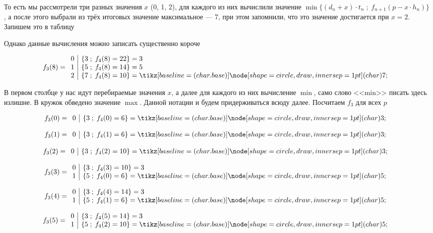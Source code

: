 \begin{enumerate}
	То есть мы рассмотрели три разных значения $x$ (0, 1, 2), для каждого из них вычислили значение $\min\Big\{(d_n + x) \cdot t_n \; ; \; f_{n+1}(p - x \cdot h_n)\Big\}$, а после этого выбрали из трёх итоговых значение максимальное --- 7, при этом запомнили, что это значение достигается при $x = 2$. Запишем это в таблицу
	
	
	
	Однако данные вычисления можно записать существенно короче
	
	\[
	f_3(8) = \begin{array}{c|l}
		0 & \{3 \; ; \; f_4(8) = 22\} = 3 \\
		1 & \{5 \; ; \; f_4(8) = 14\} = 5 \\
		2 & \{7 \; ; \; f_4(8) = 10\} = \circled{7}
	\end{array}
	\]
	
	В первом столбце у нас идут перебираемые значения $x$, а далее для каждого из них вычисление $\min$, само слово <<min>> писать здесь излишне. В кружок обведено значение $\max$. Данной нотации и будем придерживаться всюду далее. Посчитаем $f_3$ для всех $p$
	
	\[
	f_3(0) = \begin{array}{c|l}
		0 & \{3 \; ; \; f_4(0) = 6\} = \circled{3}
	\end{array}
	\]
	
	\[
	f_3(1) = \begin{array}{c|l}
		0 & \{3 \; ; \; f_4(1) = 6\} = \circled{3}
	\end{array}
	\]
	
	\[
	f_3(2) = \begin{array}{c|l}
		0 & \{3 \; ; \; f_4(2) = 10\} = \circled{3}
	\end{array}
	\]
	
	\[
	f_3(3) = \begin{array}{c|l}
		0 & \{3 \; ; \; f_4(3) = 10\} = 3 \\
		1 & \{5 \; ; \; f_4(0) = 6\} = \circled{5}
	\end{array}
	\]
	
	\[
	f_3(4) = \begin{array}{c|l}
		0 & \{3 \; ; \; f_4(4) = 14\} = 3 \\
		1 & \{5 \; ; \; f_4(1) = 6\} = \circled{5}
	\end{array}
	\]
	
	\[
	f_3(5) = \begin{array}{c|l}
		0 & \{3 \; ; \; f_4(5) = 14\} = 3 \\
		1 & \{5 \; ; \; f_4(2) = 10\} = \circled{5}
	\end{array}
	\]
	

\end{enumerate}
